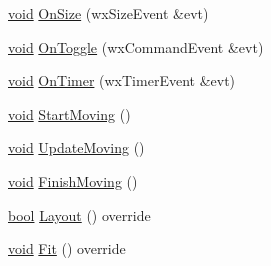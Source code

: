 \begin{DoxyCompactItemize}
\hyperlink{sound_8c_ae35f5844602719cf66324f4de2a658b3}{void} \hyperlink{class_expanding_tool_bar_a1b446d38f403652a0815c85b805e616b}{On\+Size} (wx\+Size\+Event \&evt)
\item 
\hyperlink{sound_8c_ae35f5844602719cf66324f4de2a658b3}{void} \hyperlink{class_expanding_tool_bar_a70c0d523f10e2984bca008c055301ec4}{On\+Toggle} (wx\+Command\+Event \&evt)
\item 
\hyperlink{sound_8c_ae35f5844602719cf66324f4de2a658b3}{void} \hyperlink{class_expanding_tool_bar_a175a0863891f765aa7018115ab374b0f}{On\+Timer} (wx\+Timer\+Event \&evt)
\item 
\hyperlink{sound_8c_ae35f5844602719cf66324f4de2a658b3}{void} \hyperlink{class_expanding_tool_bar_a4f9d86217a78c2a458a468ce2068a913}{Start\+Moving} ()
\item 
\hyperlink{sound_8c_ae35f5844602719cf66324f4de2a658b3}{void} \hyperlink{class_expanding_tool_bar_adc173d3adeb0dbd6b8380cdf70509de4}{Update\+Moving} ()
\item 
\hyperlink{sound_8c_ae35f5844602719cf66324f4de2a658b3}{void} \hyperlink{class_expanding_tool_bar_abf20ac96b6eb74ac03986645c6e5686f}{Finish\+Moving} ()
\item 
\hyperlink{mac_2config_2i386_2lib-src_2libsoxr_2soxr-config_8h_abb452686968e48b67397da5f97445f5b}{bool} \hyperlink{class_expanding_tool_bar_a7bafefd8720e3a5d9c8dbea546e8b5d5}{Layout} () override
\item 
\hyperlink{sound_8c_ae35f5844602719cf66324f4de2a658b3}{void} \hyperlink{class_expanding_tool_bar_ad08fdae08135fdb82862e936ed6bd63b}{Fit} () override
\end{DoxyCompactItemize}
